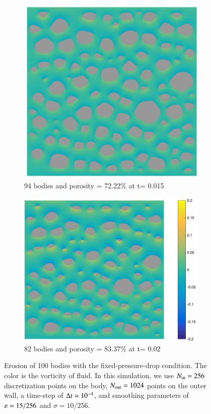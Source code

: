 \documentclass[preprint, 10pt]{elsarticle}
\begin{document}
\begin{figure}[H]
\begin{subfigure}[b]{0.5\textwidth}
\end{subfigure}
\begin{subfigure}[b]{0.5\textwidth}
\includegraphics*[width =0.9\linewidth]{./figs/100b_150}
\caption{94 bodies and porosity = 72.22\% at t= 0.015}
\end{subfigure}%
\begin{subfigure}[b]{0.5\textwidth}
\includegraphics*[width =1.1\linewidth]{./figs/100b_200}
\caption{82 bodies and porosity = 83.37\% at t= 0.02}
\end{subfigure}
\caption{\label{fig:Eroding100vort} Erosion of 100 bodies with the
  fixed-pressure-drop condition. The color is the vorticity of fluid. In
  this simulation, we use $N_{\mathrm{in}} = 256$ discretization points on the
  body, $N_{\mathrm{out}} = 1024$ points on the outer wall, a time-step of
  $\Delta t=10^{-4}$, and smoothing parameters of $\varepsilon= 15/256$ and
  $\sigma=10/256$.}
\end{figure}
\end{document}

